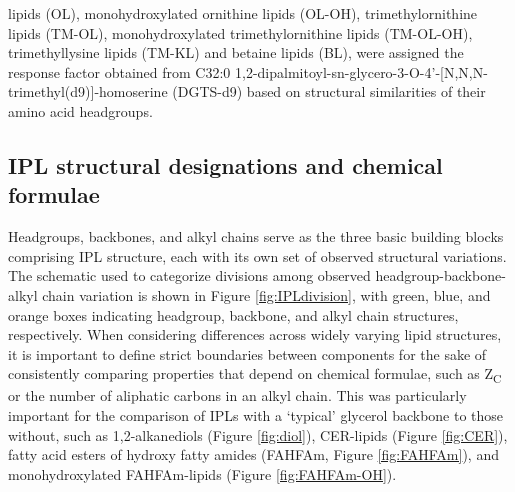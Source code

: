 lipids (OL), monohydroxylated ornithine lipids (OL-OH), trimethylornithine lipids (TM-OL), monohydroxylated trimethylornithine lipids (TM-OL-OH), trimethyllysine lipids (TM-KL) and betaine lipids (BL), were assigned the response factor obtained from C32:0 1,2-dipalmitoyl-sn-glycero-3-O-4'-[N,N,N-trimethyl(d9)]-homoserine (DGTS-d9) based on structural similarities of their amino acid headgroups.




\subsection{IPL structural designations and chemical formulae} Headgroups, backbones, and alkyl chains serve as the three basic building blocks comprising IPL structure, each with its own set of observed structural variations. The schematic used to categorize divisions among observed headgroup-backbone-alkyl chain variation is shown in Figure \ref{fig:IPLdivision}, with green, blue, and orange boxes indicating headgroup, backbone, and alkyl chain structures, respectively. When considering differences across widely varying lipid structures, it is important to define strict boundaries between components for the sake of consistently comparing properties that depend on chemical formulae, such as Z\textsubscript{C} or the number of aliphatic carbons in an alkyl chain. This was particularly important for the comparison of IPLs with a `typical' glycerol backbone to those without, such as 1,2-alkanediols (Figure \ref{fig:diol}), CER-lipids (Figure \ref{fig:CER}), fatty acid esters of hydroxy fatty amides (FAHFAm, Figure \ref{fig:FAHFAm}), and monohydroxylated FAHFAm-lipids (Figure \ref{fig:FAHFAm-OH}).


